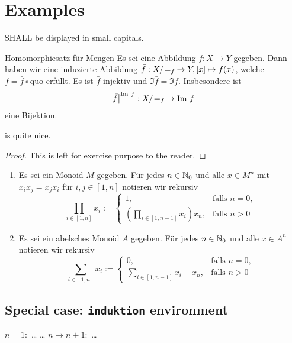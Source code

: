 \documentclass{ctext}
\begin{document}
\section{Examples}
\setcounter{aufgabe}{2}
\begin{notation}
  \bmath SHALL be displayed in small capitals.
\end{notation}
\begin{satz*}{Homomorphiesatz für Mengen}
      Es sei eine Abbildung $f: X \rightarrow Y $ gegeben. Dann haben wir eine induzierte Abbildung $\bar{f}:X/\!=_f\: \rightarrow Y, [x] \mapsto f(x)$, welche $f = \bar{f} \circ \text{quo}$ erfüllt. Es ist $\bar{f}$ injektiv und $\Im \bar{f} = \Im f$. Insbesondere ist
  \[\restr{\bar{f}}{\Im f}{} : \modulo{X}{=_f} \rightarrow \Im f \]
  eine Bijektion.
\end{satz*}
\begin{korollar}
  \bmath is quite nice.
  \begin{proof}
    This is left for exercise purpose to the reader.
  \end{proof}
\end{korollar}
\begin{notation}
  \begin{enumerate}[label=(\alph*)]
    \item Es sei ein Monoid $M$ gegeben. Für jedes $n \in \mathbb{N}_0$ und alle $x \in M^n$ mit $x_ix_j = x_jx_i$ für $i, j \in [1, n]$ notieren wir rekursiv
    \[\prod\limits_{i\in [1,n]} x_i := \begin{cases}
    1, & \text{falls } n = 0, \\
    (\prod_{i \in [1,n-1]} x_i)x_n, & \text{falls } n > 0
    \end{cases}\]
    \item Es sei ein abelsches Monoid $A$ gegeben. Für jedes $n \in \mathbb{N}_0$ und alle $x \in A^n$ notieren wir rekursiv
    \[\sum\limits_{i\in[1,n]}x_i := \begin{cases}
      0, & \text{falls } n = 0,\\
      \sum_{i \in [1, n-1]} x_i + x_n, & \text{falls } n > 0
    \end{cases}\]
  \end{enumerate}
\end{notation}
\subsection{Special case: \texttt{induktion} environment}
\begin{induktion}
  \anfang \(n = 1:\) \dots
  \voraussetzung \dots
  \schritt \(n \mapsto n+1:\) \dots
\end{induktion}
\end{document}
